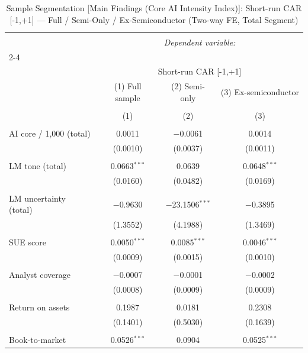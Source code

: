 
\begin{table}[!htbp] \centering 
  \caption{Sample Segmentation [Main Findings (Core AI Intensity Index)]: Short-run CAR [-1,+1] — Full / Semi-Only / Ex-Semiconductor (Two-way FE, Total Segment)} 
  \label{} 
\begin{tabular}{@{\extracolsep{5pt}}lccc} 
\\[-1.8ex]\hline 
\hline \\[-1.8ex] 
 & \multicolumn{3}{c}{\textit{Dependent variable:}} \\ 
\cline{2-4} 
\\[-1.8ex] & \multicolumn{3}{c}{Short-run CAR [-1,+1]} \\ 
 & (1) Full sample & (2) Semi-only & (3) Ex-semiconductor \\ 
\\[-1.8ex] & (1) & (2) & (3)\\ 
\hline \\[-1.8ex] 
 AI core / 1,000 (total) & 0.0011 & $-$0.0061 & 0.0014 \\ 
  & (0.0010) & (0.0037) & (0.0011) \\ 
  & & & \\ 
 LM tone (total) & 0.0663$^{***}$ & 0.0639 & 0.0648$^{***}$ \\ 
  & (0.0160) & (0.0482) & (0.0169) \\ 
  & & & \\ 
 LM uncertainty (total) & $-$0.9630 & $-$23.1506$^{***}$ & $-$0.3895 \\ 
  & (1.3552) & (4.1988) & (1.3469) \\ 
  & & & \\ 
 SUE score & 0.0050$^{***}$ & 0.0085$^{***}$ & 0.0046$^{***}$ \\ 
  & (0.0009) & (0.0015) & (0.0010) \\ 
  & & & \\ 
 Analyst coverage & $-$0.0007 & $-$0.0001 & $-$0.0002 \\ 
  & (0.0008) & (0.0009) & (0.0009) \\ 
  & & & \\ 
 Return on assets & 0.1987 & 0.0181 & 0.2308 \\ 
  & (0.1401) & (0.5030) & (0.1639) \\ 
  & & & \\ 
 Book-to-market & 0.0526$^{***}$ & 0.0904 & 0.0525$^{***}$ \\ 

\end{tabular}
\end{table}
